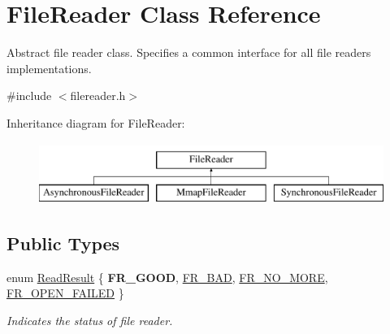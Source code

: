 \hypertarget{class_file_reader}{\section{File\-Reader Class Reference}
\label{class_file_reader}
}


Abstract file reader class. Specifies a common interface for all file readers implementations.  




{\ttfamily \#include $<$filereader.\-h$>$}

Inheritance diagram for File\-Reader\-:\begin{figure}[H]
\begin{center}
\leavevmode
\includegraphics[height=2.000000cm]{class_file_reader}
\end{center}
\end{figure}
\subsection*{Public Types}
\begin{DoxyCompactItemize}
\item 
enum \hyperlink{class_file_reader_a8e801198c62f657dd1dff8fd8dbe796f}{Read\-Result} \{ {\bfseries F\-R\-\_\-\-G\-O\-O\-D}, 
\hyperlink{class_file_reader_a8e801198c62f657dd1dff8fd8dbe796fae9f73ad13d7812bd5c4d0e6bd4c98757}{F\-R\-\_\-\-B\-A\-D}, 
\hyperlink{class_file_reader_a8e801198c62f657dd1dff8fd8dbe796fa677d417bbb7f32f5fc9c07717bf7a036}{F\-R\-\_\-\-N\-O\-\_\-\-M\-O\-R\-E}, 
\hyperlink{class_file_reader_a8e801198c62f657dd1dff8fd8dbe796fa2d89c82783e7e6491174d0c1a1302ffe}{F\-R\-\_\-\-O\-P\-E\-N\-\_\-\-F\-A\-I\-L\-E\-D}
 \}
\begin{DoxyCompactList}\small\item\em Indicates the status of file reader. \end{DoxyCompactList}\end{DoxyCompactItemize}
